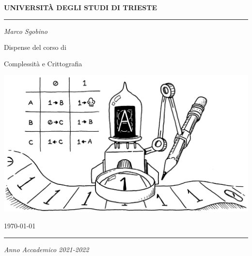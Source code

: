\thispagestyle{plain}
\begin{titlepage}
        \begin{center}
                \Large
                \setmainfont{Equity A Caps}
                \textbf{UNIVERSITÀ DEGLI STUDI DI TRIESTE}
                \setmainfont{Equity A}

                \par\noindent\rule{\textwidth}{0.8pt}
                \vspace*{0.6cm}

                \large
                \emph{Marco Sgobino}

                \large
                \vspace*{0.6cm}

                \Large Dispense del corso di
                \vspace*{0.6cm}

                \Huge
                \setmainfont{Equity A Caps}
                Complessità e Crittografia
                \setmainfont{Equity A}
                \vspace*{.1cm}


                \vspace*{2cm}

                \begin{center}
                        \includegraphics[width=.9\textwidth, keepaspectratio]{./pics/turing-machine-titlepage.jpg}
                \end{center}
                \vspace*{1cm}
                \large
                \today


                \vfill

                \par\noindent\rule{\textwidth}{0.8pt}
                \vspace*{0.6cm}
                \large
                \emph{Anno Accademico 2021-2022}

                \newpage

                \thispagestyle{plain}
                \vspace*{0.5cm}
                \vfill
        \end{center}
\end{titlepage}

